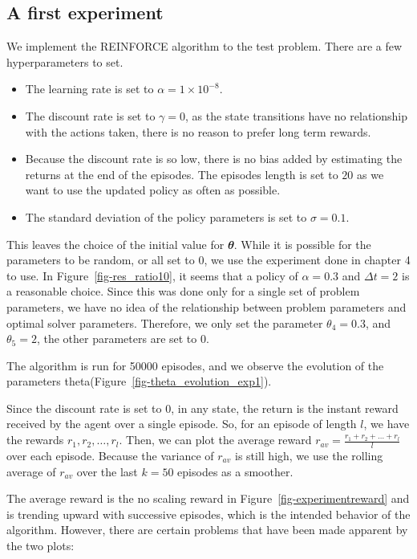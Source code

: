 \documentclass[
  letterpaper,
]{report}
\providecommand{\tightlist}{%
  \setlength{\itemsep}{0pt}\setlength{\parskip}{0pt}}\usepackage{longtable,booktabs,array}
\theoremstyle{plain}
\theoremstyle{definition}
\theoremstyle{definition}
\theoremstyle{remark}
\begin{document}
\hypertarget{a-first-experiment}{%
\subsection{A first experiment}\label{a-first-experiment}}

We implement the REINFORCE algorithm to the test problem. There are a
few hyperparameters to set.

\begin{itemize}
\tightlist
\item
  The learning rate is set to \(\alpha=1\times10^{-8}\).
\item
  The discount rate is set to \(\gamma = 0\), as the state transitions
  have no relationship with the actions taken, there is no reason to
  prefer long term rewards.
\item
  Because the discount rate is so low, there is no bias added by
  estimating the returns at the end of the episodes. The episodes length
  is set to \(20\) as we want to use the updated policy as often as
  possible.
\item
  The standard deviation of the policy parameters is set to
  \(\sigma = 0.1\).
\end{itemize}

This leaves the choice of the initial value for \(\mathbfit{\theta}\).
While it is possible for the parameters to be random, or all set to 0,
we use the experiment done in chapter 4 to use. In
Figure~\ref{fig-res_ratio10}, it seems that a policy of \(\alpha = 0.3\)
and \(\Delta t = 2\) is a reasonable choice. Since this was done only
for a single set of problem parameters, we have no idea of the
relationship between problem parameters and optimal solver parameters.
Therefore, we only set the parameter \(\theta_4 = 0.3\), and
\(\theta_5=2\), the other parameters are set to 0.

The algorithm is run for 50000 episodes, and we observe the evolution of
the parameters theta(Figure~\ref{fig-theta_evolution_exp1}).

Since the discount rate is set to \(0\), in any state, the return is the
instant reward received by the agent over a single episode. So, for an
episode of length \(l\), we have the rewards \(r_1, r_2, \dots, r_l\).
Then, we can plot the average reward
\(r_{av} = \frac{r_1 + r_2 +\dots + r_l}{l}\) over each episode. Because
the variance of \(r_{av}\) is still high, we use the rolling average of
\(r_{av}\) over the last \(k = 50\) episodes as a smoother.

The average reward is the no scaling reward in
Figure~\ref{fig-experimentreward} and is trending upward with successive
episodes, which is the intended behavior of the algorithm. However,
there are certain problems that have been made apparent by the two
plots:
\end{document}
